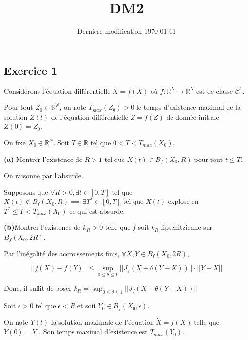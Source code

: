 \documentclass[french]{article}
\begin{document}
	\title{DM2}
	\date{Dernière modification \today}
	
	\maketitle
	
	\subsection*{Exercice 1}
	
	\begin{tcolorbox}[colback=red!5!white,colframe=red!75!black]
		Considérons l'équation différentielle $\dot{X} = f(X)$ où $f : \mathbb{R}^N \to \mathbb{R}^N$ est de classe $\mathcal{C}^1$.
		
		Pour tout $Z_0 \in \mathbb{R}^N$, on note $T_{max}(Z_0) > 0$ le temps d'existence maximal de la solution $Z(t)$ de l'équation différentielle $\dot{Z} = f(Z)$ de donnée initiale $Z(0) = Z_0$.
		
		On fixe $X_0 \in \mathbb{R}^N$. Soit $T \in \mathbb{R}$ tel que $0 < T < T_{max}(X_0)$.
	\end{tcolorbox}
	
	\begin{tcolorbox}[colback=gray!5!white,colframe=gray!75!black]
		\textbf{\large{(a)}} Montrer l'existence de $R > 1$ tel que $X(t) \in B_f(X_0, R)$ pour tout $t \leq T$.  
	\end{tcolorbox}

	On raisonne par l'absurde.
	
	Supposons que $ \forall R > 0, \exists t \in [0, T]$ tel que $X(t) \not\in B_f(X_0, R) \implies \exists T^* \in [0, T]$ tel que $X(t)$ explose en $T^* \leq T < T_{max}(X_0)$ ce qui est absurde.

	\begin{tcolorbox}[colback=gray!5!white,colframe=gray!75!black]
		\textbf{\large{(b)}}Montrer l'existence de $k_R > 0$ telle que $f$ soit $k_R$-lipschitzienne sur $B_f(X_0, 2R)$. 
	\end{tcolorbox}

	Par l'inégalité des accroissements finis, $\forall X,Y \in B_f(X_0, 2R)$,
	
	\[|| f(X) - f(Y)|| \leq \sup_{0\leq \theta \leq 1} || J_f(X + \theta(Y - X)) || \cdot ||Y - X||\]
	
	Donc, il suffit de poser $k_R = \sup_{0\leq \theta \leq 1} || J_f(X + \theta(Y - X)) ||$

	\begin{tcolorbox}[colback=red!5!white,colframe=red!75!black]
		Soit $\epsilon > 0$ tel que $\epsilon < R$ et soit $Y_0 \in B_f(X_0, \epsilon)$.
		
		On note $Y(t)$ la solution maximale de l'équation $\dot{X} = f(X)$ telle que $Y(0) = Y_0$. Son temps maximal d'existence est $T_{max}(Y_0)$.
	\end{tcolorbox}
\end{document}

